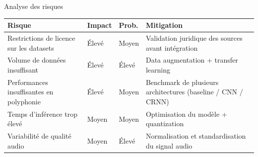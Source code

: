 \begin{frame}{Analyse des risques}
	\centering
	\begin{tabular}{p{5.4cm} l l p{5.4cm}}
		\toprule
		\textbf{Risque} & \textbf{Impact} & \textbf{Prob.} & \textbf{Mitigation} \\
		\midrule
		Restrictions de licence sur les datasets & Élevé & Moyen & Validation juridique des sources avant intégration \\
		Volume de données insuffisant & Élevé & Élevé & Data augmentation + transfer learning \\
		Performances insuffisantes en polyphonie & Élevé & Moyen & Benchmark de plusieurs architectures (baseline / CNN / CRNN) \\
		Temps d’inférence trop élevé & Moyen & Moyen & Optimisation du modèle + quantization \\
		Variabilité de qualité audio & Moyen & Élevé & Normalisation et standardisation du signal audio \\
		\bottomrule
	\end{tabular}
\end{frame}

